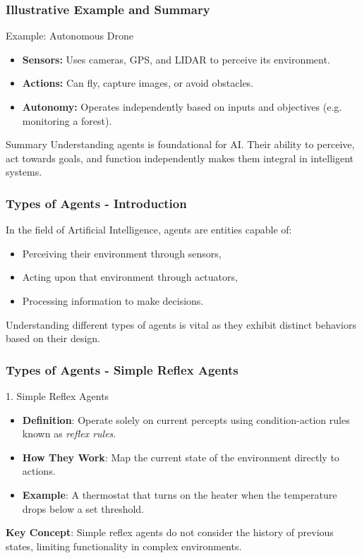\documentclass[aspectratio=169]{beamer}
\begin{document}
\begin{frame}[fragile]
    \frametitle{Illustrative Example and Summary}
    
    \begin{block}{Example: Autonomous Drone}
        \begin{itemize}
            \item \textbf{Sensors:} Uses cameras, GPS, and LIDAR to perceive its environment.
            \item \textbf{Actions:} Can fly, capture images, or avoid obstacles.
            \item \textbf{Autonomy:} Operates independently based on inputs and objectives (e.g. monitoring a forest).
        \end{itemize}
    \end{block}
    
    \begin{block}{Summary}
        Understanding agents is foundational for AI. Their ability to perceive, act towards goals, and function independently makes them integral in intelligent systems.
    \end{block}
\end{frame}

\begin{frame}[fragile]
    \frametitle{Types of Agents - Introduction}
    In the field of Artificial Intelligence, agents are entities capable of:
    \begin{itemize}
        \item Perceiving their environment through sensors,
        \item Acting upon that environment through actuators,
        \item Processing information to make decisions.
    \end{itemize}
    Understanding different types of agents is vital as they exhibit distinct behaviors based on their design.
\end{frame}

\begin{frame}[fragile]
    \frametitle{Types of Agents - Simple Reflex Agents}
    \begin{block}{1. Simple Reflex Agents}
        \begin{itemize}
            \item \textbf{Definition}: Operate solely on current percepts using condition-action rules known as \textit{reflex rules}.
            \item \textbf{How They Work}: Map the current state of the environment directly to actions.
            \item \textbf{Example}: A thermostat that turns on the heater when the temperature drops below a set threshold.
        \end{itemize}
    \end{block}
    
    \textbf{Key Concept}: Simple reflex agents do not consider the history of previous states, limiting functionality in complex environments.
\end{frame}
\end{document}
